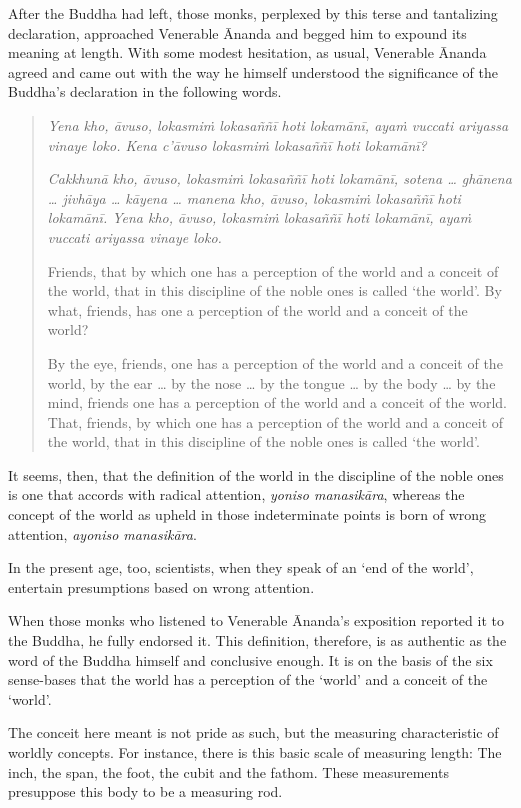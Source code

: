 After the Buddha had left, those monks, perplexed by this terse and tantalizing declaration, approached Venerable Ānanda and begged him to expound its meaning at length. With some modest hesitation, as usual, Venerable Ānanda agreed and came out with the way he himself understood the significance of the Buddha's declaration in the following words.

\begin{quote}
\emph{Yena kho, āvuso, lokasmiṁ lokasaññī hoti lokamānī, ayaṁ vuccati ariyassa vinaye loko. Kena c'āvuso lokasmiṁ lokasaññī hoti lokamānī?}

\emph{Cakkhunā kho, āvuso, lokasmiṁ lokasaññī hoti lokamānī, sotena \ldots{} ghānena \ldots{} jivhāya \ldots{} kāyena \ldots{} manena kho, āvuso, lokasmiṁ lokasaññī hoti lokamānī. Yena kho, āvuso, lokasmiṁ lokasaññī hoti lokamānī, ayaṁ vuccati ariyassa vinaye loko.}

Friends, that by which one has a perception of the world and a conceit of the world, that in this discipline of the noble ones is called `the world'. By what, friends, has one a perception of the world and a conceit of the world?

By the eye, friends, one has a perception of the world and a conceit of the world, by the ear \ldots{} by the nose \ldots{} by the tongue \ldots{} by the body \ldots{} by the mind, friends one has a perception of the world and a conceit of the world. That, friends, by which one has a perception of the world and a conceit of the world, that in this discipline of the noble ones is called `the world'.
\end{quote}

It seems, then, that the definition of the world in the discipline of the noble ones is one that accords with radical attention, \emph{yoniso manasikāra}, whereas the concept of the world as upheld in those indeterminate points is born of wrong attention, \emph{ayoniso manasikāra}.

In the present age, too, scientists, when they speak of an `end of the world', entertain presumptions based on wrong attention.

When those monks who listened to Venerable Ānanda's exposition reported it to the Buddha, he fully endorsed it. This definition, therefore, is as authentic as the word of the Buddha himself and conclusive enough. It is on the basis of the six sense-bases that the world has a perception of the `world' and a conceit of the `world'.

The conceit here meant is not pride as such, but the measuring characteristic of worldly concepts. For instance, there is this basic scale of measuring length: The inch, the span, the foot, the cubit and the fathom. These measurements presuppose this body to be a measuring rod.

